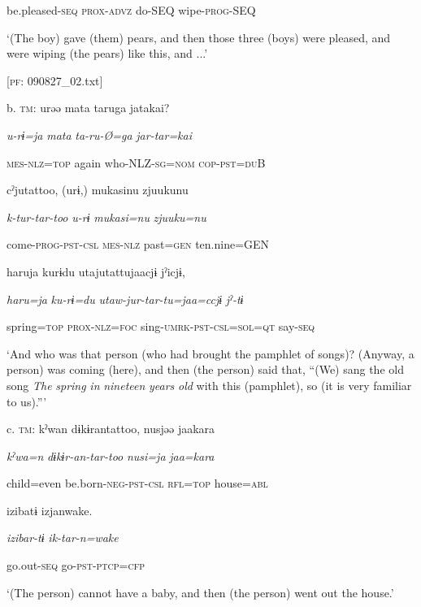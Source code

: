       be.pleased-\textsc{seq}  \textsc{prox}-\textsc{advz}  do-SEQ  wipe-\textsc{prog}-SEQ

      ‘(The boy) gave (them) pears, and then those three (boys) were pleased, and were wiping (the pears) like this, and ...’

      [\textsc{pf}: 090827\_02.txt]

  b.  \textsc{tm}:  urəə  mata  taruga  jatakai?

      \textit{u-rɨ=ja}  \textit{mata}  \textit{ta-ru-Ø=ga}  \textit{jar-tar=kai}

      \textsc{mes}-\textsc{nlz}=\textsc{top}  again  who-NLZ-\textsc{sg}=\textsc{nom}  \textsc{cop}-\textsc{pst}=\textsc{du}B

      cˀjutattoo,  (urɨ,)  mukasinu  {\textbar}zjuukunu

      \textit{k-tur-tar-too}  \textit{u-rɨ}  \textit{mukasi=nu}  \textit{zjuuku=nu}

      come-\textsc{prog}-\textsc{pst}-\textsc{csl}  \textsc{mes}-\textsc{nlz}  past=\textsc{gen}  ten.nine=GEN

      haru{\textbar}ja  kurɨdu  utajutattujaacjɨ  jˀicjɨ,

      \textit{haru=ja}  \textit{ku-rɨ=du}  \textit{utaw-jur-tar-tu=jaa=ccjɨ}  \textit{jˀ-tɨ}

      spring=\textsc{top}  \textsc{prox}-\textsc{nlz}=\textsc{foc}  sing-\textsc{umrk}-\textsc{pst}-\textsc{csl}=\textsc{sol}=\textsc{qt}  say-\textsc{seq}

      ‘And who was that person (who had brought the pamphlet of songs)? (Anyway, a person) was coming (here), and then (the person) said that, “(We) sang the old song \textit{The} \textit{spring} \textit{in} \textit{nineteen} \textit{years} \textit{old} with this (pamphlet), so (it is very familiar to us).”’

  c.  \textsc{tm}:  kˀwan  dɨkɨrantattoo,  nusjəə  jaakara

      \textit{kˀwa=n}  \textit{dɨkɨr-an-tar-too}  \textit{nusi=ja}  \textit{jaa=kara}

      child=even  be.born-\textsc{neg}-\textsc{pst}-\textsc{csl}  \textsc{rfl}=\textsc{top}  house=\textsc{abl}

      izibatɨ  izjanwake.

      \textit{izibar-tɨ}  \textit{ik-tar-n=wake}

      go.out-\textsc{seq}  go-\textsc{pst}-\textsc{ptcp}=\textsc{cfp}

      ‘(The person) cannot have a baby, and then (the person) went out the house.’

